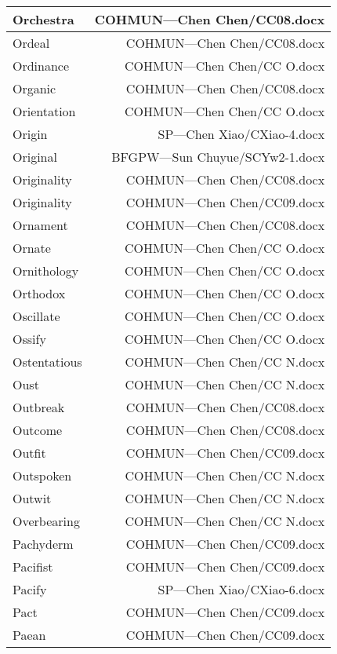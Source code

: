 \documentclass{article}
\begin{document}
\begin{center}
\begin{longtable}{|l|r|}
\hline
Orchestra  &  COHMUN---Chen Chen/CC08.docx\\  
\hline
Ordeal  &  COHMUN---Chen Chen/CC08.docx\\  
\hline
Ordinance  &  COHMUN---Chen Chen/CC O.docx\\  
\hline
Organic  &  COHMUN---Chen Chen/CC08.docx\\  
\hline
Orientation  &  COHMUN---Chen Chen/CC O.docx\\  
\hline
Origin  &  SP---Chen Xiao/CXiao-4.docx\\  
\hline
Original  &  BFGPW---Sun Chuyue/SCYw2-1.docx\\  
\hline
Originality  &  COHMUN---Chen Chen/CC08.docx\\  
\hline
Originality  &  COHMUN---Chen Chen/CC09.docx\\  
\hline
Ornament  &  COHMUN---Chen Chen/CC08.docx\\  
\hline
Ornate  &  COHMUN---Chen Chen/CC O.docx\\  
\hline
Ornithology  &  COHMUN---Chen Chen/CC O.docx\\  
\hline
Orthodox  &  COHMUN---Chen Chen/CC O.docx\\  
\hline
Oscillate  &  COHMUN---Chen Chen/CC O.docx\\  
\hline
Ossify  &  COHMUN---Chen Chen/CC O.docx\\  
\hline
Ostentatious  &  COHMUN---Chen Chen/CC N.docx\\  
\hline
Oust  &  COHMUN---Chen Chen/CC N.docx\\  
\hline
Outbreak  &  COHMUN---Chen Chen/CC08.docx\\  
\hline
Outcome  &  COHMUN---Chen Chen/CC08.docx\\  
\hline
Outfit  &  COHMUN---Chen Chen/CC09.docx\\  
\hline
Outspoken  &  COHMUN---Chen Chen/CC N.docx\\  
\hline
Outwit  &  COHMUN---Chen Chen/CC N.docx\\  
\hline
Overbearing  &  COHMUN---Chen Chen/CC N.docx\\  
\hline
Pachyderm  &  COHMUN---Chen Chen/CC09.docx\\  
\hline
Pacifist  &  COHMUN---Chen Chen/CC09.docx\\  
\hline
Pacify  &  SP---Chen Xiao/CXiao-6.docx\\  
\hline
Pact  &  COHMUN---Chen Chen/CC09.docx\\  
\hline
Paean  &  COHMUN---Chen Chen/CC09.docx\\  

\end{longtable}
\end{center}
\end{document}
